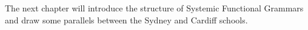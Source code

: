 
The next chapter will introduce the structure of Systemic Functional Grammars and draw some parallels between the Sydney and Cardiff schools. 

 
